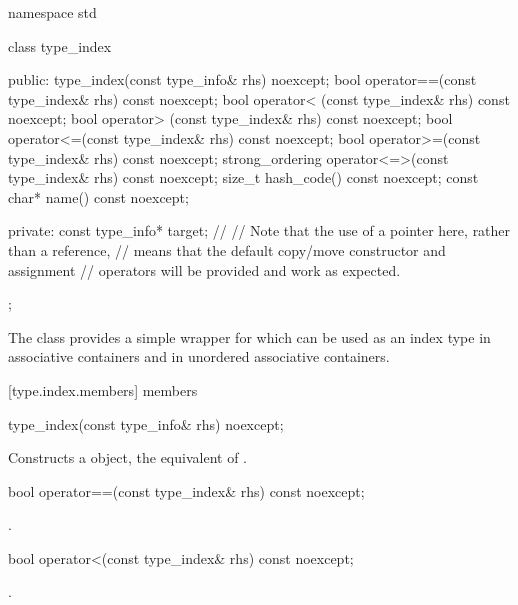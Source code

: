 %
\begin{codeblock}
namespace std {
  class type_index {
  public:
    type_index(const type_info& rhs) noexcept;
    bool operator==(const type_index& rhs) const noexcept;
    bool operator< (const type_index& rhs) const noexcept;
    bool operator> (const type_index& rhs) const noexcept;
    bool operator<=(const type_index& rhs) const noexcept;
    bool operator>=(const type_index& rhs) const noexcept;
    strong_ordering operator<=>(const type_index& rhs) const noexcept;
    size_t hash_code() const noexcept;
    const char* name() const noexcept;

  private:
    const type_info* target;    // \expos
    // Note that the use of a pointer here, rather than a reference,
    // means that the default copy/move constructor and assignment
    // operators will be provided and work as expected.
  };
}
\end{codeblock}

\pnum
The class  provides a simple wrapper for
 which can be used as an index type in associative
containers and in unordered associative
containers.

[type.index.members]{ members}

%
\begin{itemdecl}
type_index(const type_info& rhs) noexcept;
\end{itemdecl}

\begin{itemdescr}
\pnum
\effects
Constructs a  object, the equivalent of .
\end{itemdescr}

%
\begin{itemdecl}
bool operator==(const type_index& rhs) const noexcept;
\end{itemdecl}

\begin{itemdescr}
\pnum
\returns
{}.
\end{itemdescr}

%
\begin{itemdecl}
bool operator<(const type_index& rhs) const noexcept;
\end{itemdecl}

\begin{itemdescr}
\pnum
\returns
{}.
\end{itemdescr}

